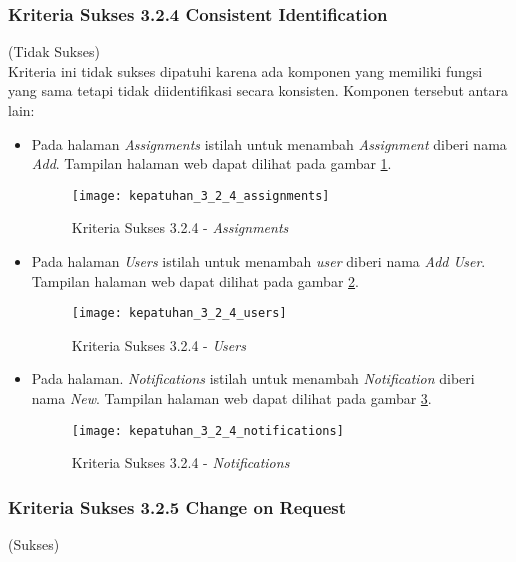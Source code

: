 \subsubsection{Kriteria Sukses 3.2.4 Consistent Identification}
\label{subsubsec:kepatuhan_kriteria_3.2.4}
(Tidak Sukses) \\

Kriteria ini tidak sukses dipatuhi karena ada komponen yang memiliki fungsi yang sama tetapi tidak diidentifikasi secara konsisten. Komponen tersebut antara lain:

\begin{itemize}
	\item Pada halaman \textit{Assignments} istilah untuk menambah \textit{Assignment} diberi nama \textit{Add}. Tampilan halaman web dapat dilihat pada gambar \ref{fig:kepatuhan_3_2_4_assignments}.
	\begin{figure}[H]
		\centering  
		\texttt{[image: kepatuhan\_3\_2\_4\_assignments]}  
		\caption[Kriteria Sukses 3.2.4 - \textit{Assignments}]{Kriteria Sukses 3.2.4 - \textit{Assignments}} 
		\label{fig:kepatuhan_3_2_4_assignments} 
	\end{figure}

	\item Pada halaman \textit{Users} istilah untuk menambah \textit{user} diberi nama \textit{Add User}. Tampilan halaman web dapat dilihat pada gambar \ref{fig:kepatuhan_3_2_4_users}.
	\begin{figure}[H]
		\centering  
		\texttt{[image: kepatuhan\_3\_2\_4\_users]}  
		\caption[Kriteria Sukses 3.2.4 - \textit{Users}]{Kriteria Sukses 3.2.4 - \textit{Users}} 
		\label{fig:kepatuhan_3_2_4_users} 
	\end{figure}

	\item Pada halaman. \textit{Notifications} istilah untuk menambah \textit{Notification} diberi nama \textit{New}. Tampilan halaman web dapat dilihat pada gambar \ref{fig:kepatuhan_3_2_4_notifications}.
	\begin{figure}[H]
		\centering  
		\texttt{[image: kepatuhan\_3\_2\_4\_notifications]}  
		\caption[Kriteria Sukses 3.2.4 - \textit{Notifications}]{Kriteria Sukses 3.2.4 - \textit{Notifications}} 
		\label{fig:kepatuhan_3_2_4_notifications} 
	\end{figure}

\end{itemize}

\subsubsection{Kriteria Sukses 3.2.5 Change on Request}
\label{subsubsec:kepatuhan_kriteria_3.2.5}
(Sukses) \\

